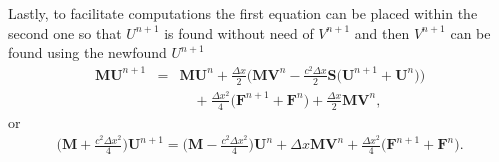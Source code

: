 Lastly, to facilitate computations the first equation can be placed within the second one so that $U^{n+1}$ is found without need of $V^{n+1}$ and then $V^{n+1}$ can be found using the newfound $U^{n+1}$
\begin{eqnarray*}
  \bm{M}\bm{U}^{n+1} & = & \bm{M}\bm{U}^n + \frac{\Delta x}{2}\bigg(\bm{M}\bm{V}^n - \frac{c^2\Delta x}{2}\bm{S}\big(\bm{U}^{n+1} + \bm{U}^n\big)\bigg) \\
  &  & \quad + \frac{\Delta x^2}{4}\big(\bm{F}^{n+1} + \bm{F}^n\big) + \frac{\Delta x}{2}\bm{M}\bm{V}^n,
\end{eqnarray*}
or
\begin{eqnarray}
  \bigg(\bm{M} + \frac{c^2\Delta x^2}{4}\bigg)\bm{U}^{n+1} = \bigg(\bm{M} - \frac{c^2\Delta x^2}{4}\bigg)\bm{U}^n + \Delta x\bm{M}\bm{V}^n + \frac{\Delta x^2}{4}\big(\bm{F}^{n+1} + \bm{F}^n\big).
\end{eqnarray}
